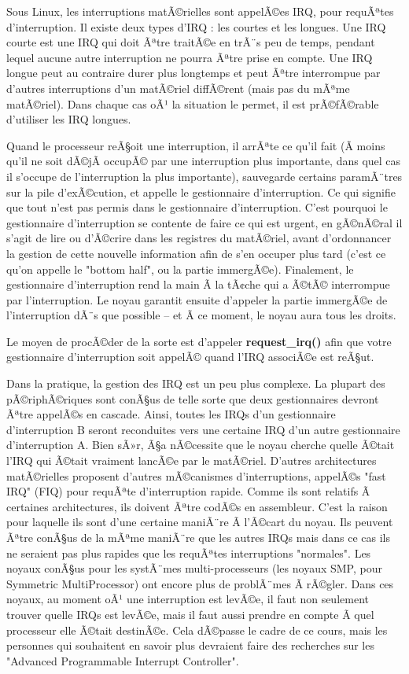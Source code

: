\documentclass[11pt]{article}
\begin{document}
Sous Linux, les interruptions matÃ©rielles sont appelÃ©es IRQ, pour requÃªtes d'interruption. Il existe deux types d'IRQ : les courtes et les longues. Une IRQ courte est une IRQ qui doit Ãªtre traitÃ©e en trÃ¨s peu de temps, pendant lequel aucune autre interruption ne pourra Ãªtre prise en compte. Une IRQ longue peut au contraire durer plus longtemps et peut Ãªtre interrompue par d'autres interruptions d'un matÃ©riel diffÃ©rent (mais pas du mÃªme matÃ©riel). Dans chaque cas oÃ¹ la situation le permet, il est prÃ©fÃ©rable d'utiliser les IRQ longues.

Quand le processeur reÃ§oit une interruption, il arrÃªte ce qu'il fait (Ã  moins qu'il ne soit dÃ©jÃ  occupÃ© par une interruption plus importante, dans quel cas il s'occupe de l'interruption la plus importante), sauvegarde certains paramÃ¨tres sur la pile d'exÃ©cution, et appelle le gestionnaire d'interruption. Ce qui signifie que tout n'est pas permis dans le gestionnaire d'interruption. C'est pourquoi le gestionnaire d'interruption se contente de faire ce qui est urgent, en gÃ©nÃ©ral il s'agit de lire ou d'Ã©crire dans les registres du matÃ©riel, avant d'ordonnancer la gestion de cette nouvelle information afin de s'en occuper plus tard (c'est ce qu'on appelle le "bottom half", ou la partie immergÃ©e). Finalement, le gestionnaire d'interruption rend la main Ã  la tÃ¢che qui a Ã©tÃ© interrompue par l'interruption. Le noyau garantit ensuite d'appeler la partie immergÃ©e de l'interruption dÃ¨s que possible -- et Ã  ce moment, le noyau aura tous les droits.

Le moyen de procÃ©der de la sorte est d'appeler \textbf{request\_irq()} afin que votre gestionnaire d'interruption soit appelÃ© quand l'IRQ associÃ©e est reÃ§ut.

Dans la pratique, la gestion des IRQ est un peu plus complexe. La plupart des pÃ©riphÃ©riques sont conÃ§us de telle sorte que deux gestionnaires devront Ãªtre appelÃ©s en cascade. Ainsi, toutes les IRQs d'un gestionnaire d'interruption B seront reconduites vers une certaine IRQ d'un autre gestionnaire d'interruption A. Bien sÃ»r, Ã§a nÃ©cessite que le noyau cherche quelle Ã©tait l'IRQ qui Ã©tait vraiment lancÃ©e par le matÃ©riel. D'autres architectures matÃ©rielles proposent d'autres mÃ©canismes d'interruptions, appelÃ©s "fast IRQ" (FIQ) pour requÃªte d'interruption rapide. Comme ils sont relatifs Ã  certaines architectures, ils doivent Ãªtre codÃ©s en assembleur. C'est la raison pour laquelle ils sont d'une certaine maniÃ¨re Ã  l'Ã©cart du noyau. Ils peuvent Ãªtre conÃ§us de la mÃªme maniÃ¨re que les autres IRQs mais dans ce cas ils ne seraient pas plus rapides que les requÃªtes interruptions "normales". Les noyaux conÃ§us pour les systÃ¨mes multi-processeurs (les noyaux SMP, pour Symmetric MultiProcessor) ont encore plus de problÃ¨mes Ã  rÃ©gler. Dans ces noyaux, au moment oÃ¹ une interruption est levÃ©e, il faut non seulement trouver quelle IRQs est levÃ©e, mais il faut aussi prendre en compte Ã  quel processeur elle Ã©tait destinÃ©e. Cela dÃ©passe le cadre de ce cours, mais les personnes qui souhaitent en savoir plus devraient faire des recherches sur les "Advanced Programmable Interrupt Controller".
\end{document}
